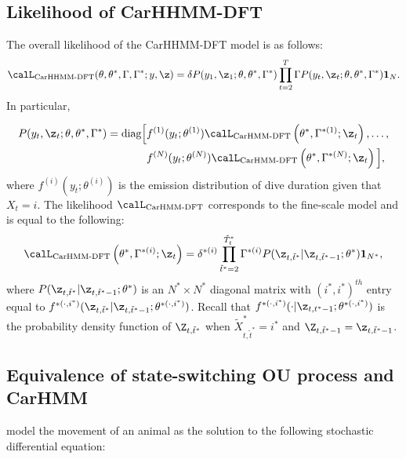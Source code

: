
\subsection{Likelihood of CarHHMM-DFT}

The overall likelihood of the CarHHMM-DFT model is as follows:
%
\[\calL_{\text{CarHHMM-DFT}}(\theta,\theta^*,\Gamma,\Gamma^*;y,\z) = \delta P(y_1,\z_1;\theta,\theta^*,\Gamma^*) \prod_{t=2}^T \Gamma P(y_t,\z_t;\theta,\theta^*,\Gamma^*) \mathbf{1}_N.\]
%
In particular,

\begin{align*}
P(y_t,\z_t;\theta,\theta^*,\Gamma^*)  = \text{diag}\Big[&f^{(1)}(y_t;\theta^{(1)})\calL_{\text{CarHMM-DFT}}\left(\theta^*,\Gamma^{*(1)};\z_t\right), \ldots , \\
&f^{(N)}(y_t;\theta^{(N)})\calL_{\text{CarHMM-DFT}}\left(\theta^*,\Gamma^{*(N)};\z_t\right) \Big],
\end{align*}
%
where $f^{(i)}(y_t;\theta^{(i)})$ is the emission distribution of dive duration given that $X_t = i$. The likelihood $\calL_{\text{CarHMM-DFT}}$ corresponds to the fine-scale model and is equal to the following:
%
\[\calL_{\text{CarHMM-DFT}}\left(\theta^{*},\Gamma^{*(i)};\z_t\right) = \delta^{*(i)} \prod_{\tilde t^* = 2}^{\tilde T^*_t} \Gamma^{*(i)} P(\z_{t,\tilde t^*}|\z_{t,\tilde t^*-1};\theta^*) \mathbf{1}_{N^*},\]
%
where $P(\z_{t,\tilde t^*}|\z_{t,\tilde t^*-1};\theta^*)$ is an $N^* \times N^*$ diagonal matrix with $(i^*,i^*)^{th}$ entry equal to $f^{*(\cdot,i^*)}(\z_{t,\tilde t^*}|\z_{t,\tilde t^*-1}; \theta^{*(\cdot,i^*)})$.
%
Recall that $f^{*(\cdot,i^*)}(\cdot|\z_{t,t^*-1}; \theta^{*(\cdot,i^*)})$ is the probability density function of $\Z_{t,\tilde t^*}$ when $\tilde X^*_{t,\tilde t^*} = i^*$ and $\Z_{t,\tilde t^*-1} = \z_{t,\tilde t^*-1}$.


\iffalse

\subsection{Equivalence of state-switching OU process and CarHMM}

\citet{Michelot:2019} model the movement of an animal as the solution to the following stochastic differential equation:

